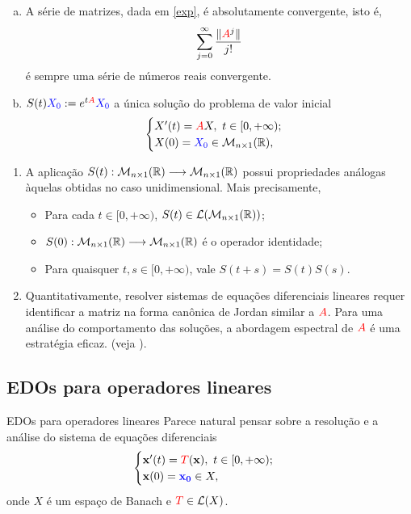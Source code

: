 \begin{frame}
  \begin{enumerate}[(a)]
 \item A série de matrizes, dada em \eqref{exp}, é 
{\color{blue}absolutamente convergente}, isto é,
    \[
    \displaystyle \sum_{j=0}^{\infty} \frac{\| {\color{red}A}^j \|}{j!}
    \]
    é sempre uma série de números reais convergente.
    \item $S(t){\color{blue}X_0} := e^{t{\color{red}A}} {\color{blue}X_0}$ a única solução do problema de valor inicial
    \[
\begin{cases}
    X'(t)={\color{red}A} X,\ t\in [0,+\infty);\\
    X(0)={\color{blue}X_0} \in \mathcal M_{n\times 1} (\mathbb{R} ),
\end{cases}
\]
    \end{enumerate}
\end{frame}

\begin{frame}

\begin{enumerate}[c]
    \item A aplicação $S(t): \mathcal M_{n\times 1} (\mathbb{R}) \longrightarrow \mathcal{M}_{n\times 1} (\mathbb{R})$ possui propriedades análogas àquelas obtidas no caso unidimensional. Mais precisamente,
    \begin{itemize}
    \item Para cada $t\in [0,+\infty)$, $S(t)\in \mathcal L (\mathcal M_{n\times 1} (\mathbb{R}))$;
    \item $S(0):\mathcal M_{n\times 1} (\mathbb{R}) \longrightarrow \mathcal M_{n\times 1} (\mathbb{R})$ é o operador identidade;
    \item Para quaisquer $t,s\in [0,+\infty)$, vale $S(t+s)=S(t)S(s)$.
    \end{itemize}

 \item Quantitativamente, resolver sistemas de equações diferenciais lineares requer identificar a matriz na forma canônica de Jordan similar a \( {\color{red}A} \). Para uma análise do comportamento das soluções, a abordagem espectral de \( {\color{red}A} \) é uma estratégia eficaz. (veja \cite{rirsch1974differential}). 
   
\end{enumerate}
\end{frame}


\subsection*{EDOs para operadores lineares}
\begin{frame}{EDOs para operadores lineares}
Parece natural pensar sobre a resolução e a análise do sistema de equações diferenciais
\[
\begin{cases}
    \mathbf{x'}(t)={\color{red}T}(\mathbf{x}),\ t\in [0,+\infty);\\
    \mathbf{x}(0)={\color{blue}\mathbf{x_0}} \in X,
\end{cases}
\]
onde $X$ é um espaço de Banach e ${\color{red}T}\in \mathcal L (X)$.


\end{frame}

